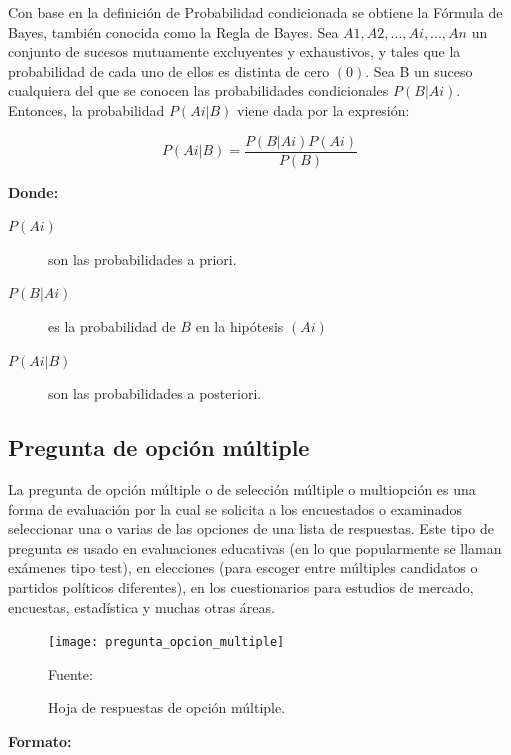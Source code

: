 Con base en la definición de Probabilidad condicionada \citep{bayes_formula} se obtiene la Fórmula de Bayes, también conocida como la Regla de Bayes.
\vskip 0.5cm 
Sea ${ A 1 , A 2 , . . . , A i , . . . , A n }$ un conjunto de sucesos mutuamente excluyentes y exhaustivos, y tales que la probabilidad de cada uno de ellos es distinta de cero $(0)$. Sea B un suceso cualquiera del que se conocen las probabilidades condicionales $P ( B | A i )$. Entonces, la probabilidad $P ( A i | B )$ viene dada por la expresión: 

\[ P ( A i | B )  = \frac{P ( B | A i ) P ( A i )} {P ( B )} \]

{\bf Donde:}\par

\begin{description}
	\item[$P ( A i )$] son las probabilidades a priori.
	\item[$P ( B | A i )$] es la probabilidad de $B$ en la hipótesis $( A i )$
	\item[$P ( A i | B )$] son las probabilidades a posteriori. 
\end{description}

\subsection{Pregunta de opción múltiple}

La pregunta de opción múltiple o de selección múltiple o multiopción es una forma de
evaluación por la cual se solicita a los encuestados o examinados seleccionar una o varias de las opciones de una lista de respuestas.
\vskip 1cm 
Este tipo de pregunta es usado en evaluaciones educativas (en lo que popularmente se llaman exámenes tipo test), en elecciones (para escoger entre múltiples candidatos o partidos políticos diferentes), en los cuestionarios para estudios de mercado, encuestas, estadística y muchas otras áreas.

\begin{figure}[ht]
	\begin{center}
		\texttt{[image: pregunta\_opcion\_multiple]}
	\end{center}
	\begin{center}
		\vskip -0.5cm
		\caption{\small{Hoja de respuestas de opción múltiple.}}
		{\small{Fuente: \citep{pregunta_opcion_multiple}}}
	\end{center}
\end{figure}
 
{\bf Formato:}\par

